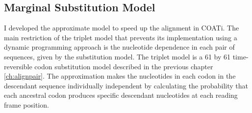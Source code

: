 
\subsection{Marginal Substitution Model} %


I developed the approximate model to speed up the alignment in COATi. The main restriction of the triplet model that prevents its implementation using a dynamic programming approach is the nucleotide dependence in each pair of sequences, given by the substitution model. The triplet model is a 61 by 61 time-reversible codon substitution model described in the previous chapter \ref{ch:alignpair}. The approximation makes the nucleotides in each codon in the descendant sequence individually independent by calculating the probability that each ancestral codon produces specific descendant nucleotides at each reading frame position.

